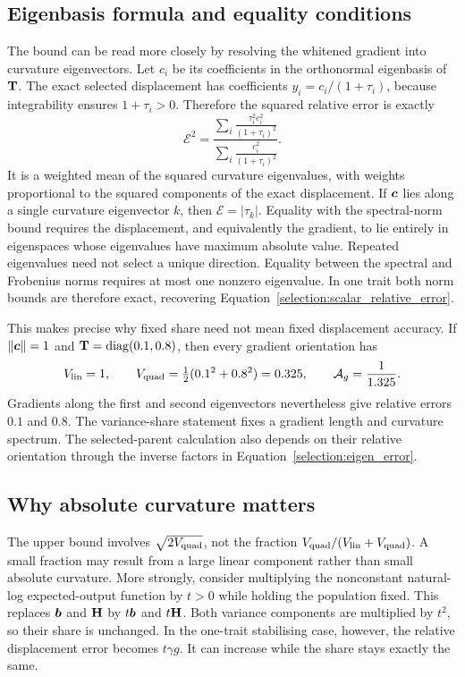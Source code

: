 \subsection{Eigenbasis formula and equality conditions}
\label{selection:eigenbasis_error}

The bound can be read more closely by resolving the whitened gradient
into curvature eigenvectors. Let $c_i$ be its coefficients in the
orthonormal eigenbasis of $\mathbf{T}$. The exact selected displacement has
coefficients $y_i=c_i/(1+\tau_i)$, because integrability ensures
$1+\tau_i>0$. Therefore the squared relative error is exactly
\begin{equation}
\mathcal E^2
 =\frac{\displaystyle\sum_i
           \frac{\tau_i^2c_i^2}{(1+\tau_i)^2}}
         {\displaystyle\sum_i
           \frac{c_i^2}{(1+\tau_i)^2}}.
\label{selection:eigen_error}
\end{equation}
It is a weighted mean of the squared curvature eigenvalues, with weights
proportional to the squared components of the exact displacement.
If $\boldsymbol{c}$ lies along a single curvature eigenvector $k$, then
$\mathcal E=|\tau_k|$. Equality with the spectral-norm bound requires
the displacement, and equivalently the gradient, to lie entirely in
eigenspaces whose eigenvalues have maximum absolute value. Repeated
eigenvalues need not select a unique direction. Equality between the
spectral and Frobenius norms requires at most one nonzero eigenvalue.
In one trait both norm bounds are therefore exact, recovering
Equation~\eqref{selection:scalar_relative_error}.

This makes precise why fixed share need not mean fixed displacement
accuracy. If $\left\lVert \boldsymbol{c}\right\rVert=1$ and
$\mathbf{T}=\operatorname{diag}(0.1,0.8)$, then every gradient orientation
has
\[
V_{\mathrm{lin}}=1,\qquad V_{\mathrm{quad}}=\tfrac12(0.1^2+0.8^2)=0.325,
\qquad \mathcal A_g=\frac1{1.325}.
\]
Gradients along the first and second eigenvectors nevertheless give
relative errors $0.1$ and $0.8$. The variance-share statement fixes a
gradient length and curvature spectrum. The selected-parent calculation
also depends on their relative orientation through the inverse factors
in Equation~\eqref{selection:eigen_error}.

\subsection{Why absolute curvature matters}
\label{selection:absolute_scale}

The upper bound involves $\sqrt{2V_{\mathrm{quad}}}$, not the fraction
$V_{\mathrm{quad}}/(V_{\mathrm{lin}}+V_{\mathrm{quad}})$. A small fraction may result from a large
linear component rather than small absolute curvature. More strongly,
consider multiplying the nonconstant natural-log expected-output
function by $t>0$ while holding the population fixed. This replaces
$\boldsymbol{b}$ and $\mathbf{H}$ by $t\boldsymbol{b}$ and $t\mathbf{H}$. Both variance
components are multiplied by $t^2$, so their share is unchanged. In the
one-trait stabilising case, however, the relative displacement error
becomes $t\gamma g$. It can increase while the share stays exactly the
same.

